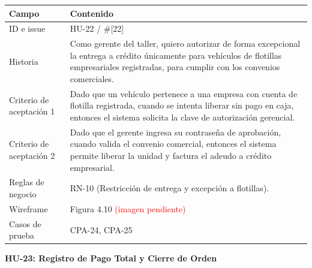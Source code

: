 {\def\LTcaptype{none} %
\begin{longtable}[]{@{}
  >{\raggedright\arraybackslash}p{}
  >{\raggedright\arraybackslash}p{}@{}}
\toprule\noalign{}
\begin{minipage}[b]{\linewidth}\raggedright
\textbf{Campo}
\end{minipage} & \begin{minipage}[b]{\linewidth}\raggedright
\textbf{Contenido}
\end{minipage} \\
\midrule\noalign{}
\endhead
\bottomrule\noalign{}
\endlastfoot
ID e issue & HU-22 / \#{[}22{]} \\
Historia & Como gerente del taller, quiero autorizar de forma
excepcional la entrega a crédito únicamente para vehículos de flotillas
empresariales registradas, para cumplir con los convenios
comerciales. \\
Criterio de aceptación 1 & Dado que un vehículo pertenece a una empresa
con cuenta de flotilla registrada, cuando se intenta liberar sin pago en
caja, entonces el sistema solicita la clave de autorización
gerencial. \\
Criterio de aceptación 2 & Dado que el gerente ingresa su contraseña de
aprobación, cuando valida el convenio comercial, entonces el sistema
permite liberar la unidad y factura el adeudo a crédito empresarial. \\
Reglas de negocio & RN-10 (Restricción de entrega y excepción a
flotillas). \\
Wireframe & Figura 4.10 \textcolor{red}{(imagen pendiente)} \\
Casos de prueba & CPA-24, CPA-25 \\
\end{longtable}
}

\textbf{HU-23: Registro de Pago Total y Cierre de Orden}

